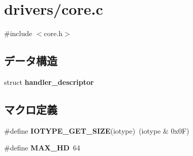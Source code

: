 \section{drivers/core.c}
\label{core_8c}
{\ttfamily \#include $<$core.\-h$>$}\*
\subsection*{データ構造}
\begin{DoxyCompactItemize}
\item 
struct {\bf handler\-\_\-descriptor}
\end{DoxyCompactItemize}
\subsection*{マクロ定義}
\begin{DoxyCompactItemize}
\item 
\#define {\bfseries \-I\-O\-T\-Y\-P\-E\-\_\-\-G\-E\-T\-\_\-\-S\-I\-Z\-E}(iotype)~(iotype \& 0x0\-F)\label{core_8c_aea418cbb2443f1abfd648364619c1347}

\item 
\#define {\bfseries \-M\-A\-X\-\_\-\-H\-D}~64\label{core_8c_a4f3fd33d1e0605d7f39a3b31eca805b7}

\end{DoxyCompactItemize}
